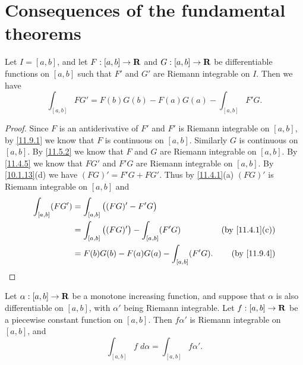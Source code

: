 \section{Consequences of the fundamental theorems}\label{sec 11.10}

\begin{proposition}\label{11.10.1}
  Let \(I = [a, b]\), and let \(F : [a, b] \to \mathbf{R}\) and \(G : [a, b] \to \mathbf{R}\) be differentiable functions on \([a, b]\) such that \(F'\) and \(G'\) are Riemann integrable on \(I\).
  Then we have
  \[
    \int_{[a, b]} F G' = F(b) G(b) - F(a) G(a) - \int_{[a, b]} F' G.
  \]
\end{proposition}

\begin{proof}
  Since \(F\) is an antiderivative of \(F'\) and \(F'\) is Riemann integrable on \([a, b]\), by \cref{11.9.1} we know that \(F\) is continuous on \([a, b]\).
  Similarly \(G\) is continuous on \([a, b]\).
  By \cref{11.5.2} we know that \(F\) and \(G\) are Riemann integrable on \([a, b]\).
  By \cref{11.4.5} we know that \(F G'\) and \(F' G\) are Riemann integrable on \([a, b]\).
  By \cref{10.1.13}(d) we have \((FG)' = F' G + F G'\).
  Thus by \cref{11.4.1}(a) \((FG)'\) is Riemann integrable on \([a, b]\) and
  \begin{align*}
    \int_{[a, b]} (F G') & = \int_{[a, b]} \big((FG)' - F' G\big)                                                \\
                         & = \int_{[a, b]} \big((FG)'\big) - \int_{[a, b]} (F' G) & \text{(by \cref{11.4.1}(c))} \\
                         & = F(b) G(b) - F(a) G(a) - \int_{[a, b]} (F' G).        & \text{(by \cref{11.9.4})}
  \end{align*}
\end{proof}

\begin{theorem}\label{11.10.2}
  Let \(\alpha : [a, b] \to \mathbf{R}\) be a monotone increasing function, and suppose that \(\alpha\) is also differentiable on \([a, b]\), with \(\alpha'\) being Riemann integrable.
  Let \(f : [a, b] \to \mathbf{R}\) be a piecewise constant function on \([a, b]\).
  Then \(f \alpha'\) is Riemann integrable on \([a, b]\), and
  \[
    \int_{[a, b]} f \; d \alpha = \int_{[a, b]} f \alpha'.
  \]
\end{theorem}

